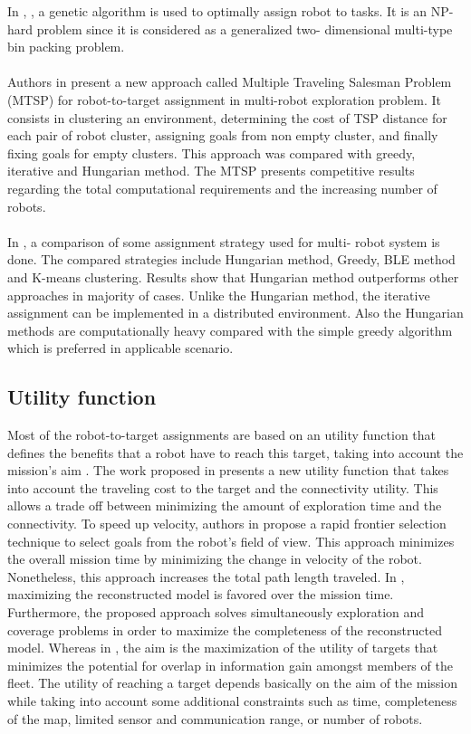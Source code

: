 \documentclass[11pt,openany]{book}
\begin{document}
In \cite{zhao1996genetic}, \cite{leigh2007using}, a genetic algorithm is used to optimally assign robot to tasks. It is an NP-hard problem since it is considered as a generalized two- dimensional multi-type bin packing problem.\\\\
Authors in \cite{faigl2012goal} present a new approach called Multiple Traveling Salesman Problem (MTSP) for robot-to-target assignment in multi-robot exploration problem. It consists in clustering an environment, determining the cost of TSP distance for each pair of robot cluster, assigning goals from non empty cluster, and finally fixing goals for empty clusters. This approach was compared with greedy, iterative and Hungarian method. The MTSP presents competitive results regarding the total computational requirements and the increasing number of robots.\\\\
In \cite{kulich2015comparison}, a comparison of some assignment strategy used for multi- robot system is done. The compared strategies include Hungarian method, Greedy, BLE method and K-means clustering. Results show that Hungarian method outperforms other approaches in majority of cases. Unlike the Hungarian method, the iterative assignment can be implemented in a distributed environment. Also the Hungarian methods are computationally heavy compared with the simple greedy algorithm which is preferred in applicable scenario.
\subsection{Utility function}
Most of the robot-to-target assignments are based on an utility function that defines the benefits that a robot have to reach this target, taking into account the mission’s aim \cite{burgard2000collaborative}. The work proposed in \cite{benavides2016multi} presents a new utility function that takes into account the traveling cost to the target and the connectivity utility. This allows a trade off between minimizing the amount of exploration time and the connectivity. To speed up velocity, authors in \cite{cieslewski2017rapid} propose a rapid frontier selection technique to select goals from the robot’s field of view. This approach minimizes the overall mission time by minimizing the change in velocity of the robot. Nonetheless, this approach increases the total path length traveled. In \cite{heng2015efficient}, maximizing the reconstructed model is favored over the mission time. Furthermore, the proposed approach solves simultaneously exploration and coverage problems in order to maximize the completeness of the reconstructed model. Whereas in \cite{simmons2000coordination}, the aim is the maximization of the utility of targets that minimizes the potential for overlap in information gain amongst members of the ﬂeet. The utility of reaching a target depends basically on the aim of the mission while taking into account some additional constraints such as time, completeness of the map, limited sensor and communication range, or number of robots.
\end{document}

